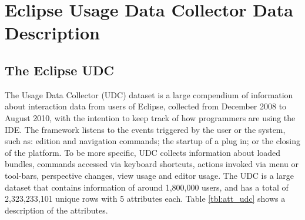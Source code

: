 \documentclass[times]{smrauth}
\begin{document}
%		
%
%





\section{Eclipse Usage Data Collector Data Description}

\subsection{The Eclipse UDC}
The Usage Data Collector (UDC) dataset is a large compendium of information about interaction data from users of Eclipse, collected from December 2008 to August 2010, with the intention to keep track of how programmers are using the IDE. The framework listens to the events triggered by the user or the system, such as: edition and navigation commands; the startup of a plug in; or the closing of the platform. To be more specific, UDC collects information about loaded bundles, commands accessed via keyboard shortcuts, actions invoked via menu or tool-bars, perspective changes, view usage and editor usage. The UDC is a large dataset that contains information of around 1,800,000 users, and has a total of 2,323,233,101 unique rows with 5 attributes each. Table \ref{tbl:att_udc} shows a description of the attributes.
\end{document}
